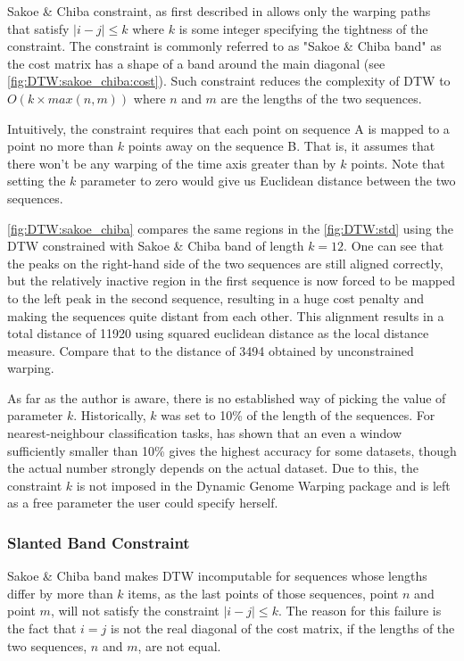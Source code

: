 \documentclass[parskip]{cs4rep}
\begin{document}
Sakoe \& Chiba constraint, as first described in \citep{Sakoe:1978ta} allows only the warping paths 
that satisfy $|i-j| \le k$ where $k$ is some integer specifying the tightness of the constraint. The constraint is commonly referred to as "Sakoe \& Chiba band" as the cost matrix has a shape of a band around the main diagonal (see \autoref{fig:DTW:sakoe_chiba:cost}). Such constraint reduces the complexity of DTW to $O(k \times max(n,m))$ where $n$ and $m$ are the lengths of the two sequences. 

Intuitively, the constraint requires that each point on sequence A is mapped to a point no more than $k$ points away on the sequence B. That is, it assumes that there won't be any warping of the time axis greater than by $k$ points. Note that setting the $k$ parameter to zero would give us Euclidean distance between the two sequences.

\autoref{fig:DTW:sakoe_chiba} compares the same regions in the \autoref{fig:DTW:std} using the DTW constrained with Sakoe \& Chiba band of length $k=12$. One can see that the peaks on the right-hand side of the two sequences are still aligned correctly, but the relatively inactive region in the first sequence is now forced to be mapped to the left peak in the second sequence, resulting in a huge cost penalty and making the sequences quite distant from each other. This alignment results in a total distance of 11920 using squared euclidean distance as the local distance measure. Compare that to the distance of 3494 obtained by unconstrained warping.

As far as the author is aware, there is no established way of picking the value of parameter $k$.
Historically, $k$ was set to 10\% of the length of the sequences.
For nearest-neighbour classification tasks, \cite{Ratanamahatana:2004wu} has shown that an even a window sufficiently smaller than 10\% gives the highest accuracy for some datasets, though the actual number strongly depends on the actual dataset. Due to this, the constraint $k$ is not imposed in the Dynamic Genome Warping package and is left as a free parameter the user could specify herself.

\subsubsection{Slanted Band Constraint}
\label{sec:slanted-band-constraint}

Sakoe \& Chiba band makes DTW incomputable for sequences whose lengths differ by more than $k$ items, as the last points of those sequences, point $n$ and point $m$, will not satisfy the constraint 
$|i-j| \le k$. The reason for this failure is the fact that $i=j$ is not the real diagonal of the cost matrix, if the lengths of the two sequences, $n$ and $m$, are not equal. 
\end{document}
